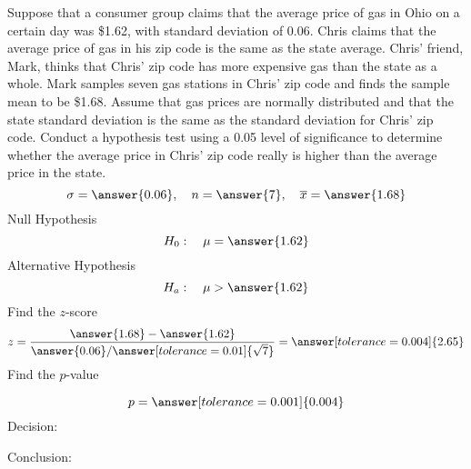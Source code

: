 \documentclass{ximera}
\begin{document}
\begin{problem}\label{prob:140quiz10prob2}
Suppose that a consumer group claims that the average price of gas in Ohio on a certain day was \$1.62, with standard deviation of 0.06.  Chris claims that the average price of gas in his zip code is the same as the state average.  Chris' friend, Mark, thinks that Chris' zip code has more expensive gas than the state as a whole.  Mark samples seven gas stations in Chris' zip code and finds the sample mean to be \$1.68.  Assume that gas prices are normally distributed and that the state standard deviation is the same as the standard deviation for Chris' zip code. Conduct a hypothesis test using a 0.05 level of significance to determine whether the average price in Chris' zip code really is higher than the average price in the state.
$$\sigma=\answer{0.06},\quad n=\answer{7},\quad \overline{x}=\answer{1.68}$$
Null Hypothesis
$$H_0:\quad \mu=\answer{1.62}$$
Alternative Hypothesis
$$H_a:\quad \mu>\answer{1.62}$$
Find the $z$-score
$$z=\frac{\answer{1.68}-\answer{1.62}}{\answer{0.06}/\answer[tolerance=0.01]{\sqrt{7}}}=\answer[tolerance=0.004]{2.65}$$
Find the $p$-value
\begin{center}  
\end{center}
$$p=\answer[tolerance=0.001]{0.004}$$
Decision:

\begin{multipleChoice} 
\end{multipleChoice}  

Conclusion:

\begin{multipleChoice} 
\end{multipleChoice} 

\end{problem}
\end{document}

